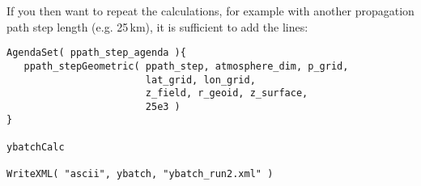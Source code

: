 If you then want to repeat the calculations, for example with another
propagation path step length (e.g. 25\,km), it is sufficient to add
the lines:

\begin{lstlisting}
AgendaSet( ppath_step_agenda ){
   ppath_stepGeometric( ppath_step, atmosphere_dim, p_grid,
                        lat_grid, lon_grid,
                        z_field, r_geoid, z_surface,
                        25e3 )
}

ybatchCalc

WriteXML( "ascii", ybatch, "ybatch_run2.xml" )
\end{lstlisting}


